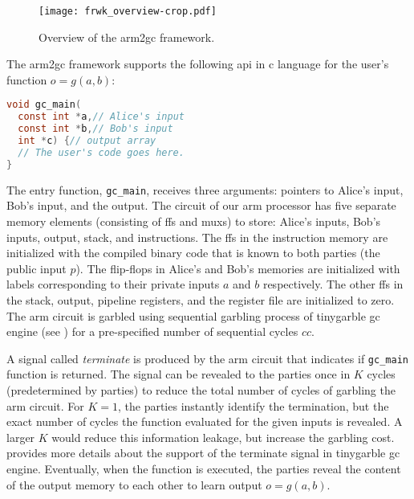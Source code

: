 \begin{figure}
\centering
\texttt{[image: frwk\_overview-crop.pdf]}
\caption{Overview of the \gls{arm2gc} framework.}\label{fig:frwk_overview}
\end{figure}

The \gls{arm2gc} framework supports the following \acrshort{api} in \gls{c} language for the user's function $o = g(a,b)$:
\begin{lstlisting}[language=C,basicstyle=\ttfamily,keywordstyle=\color{blue}\ttfamily,stringstyle=\color{red}\ttfamily,commentstyle=\color{CommentColor}\ttfamily]
void gc_main(
  const int *a,// Alice's input
  const int *b,// Bob's input
  int *c) {// output array
  // The user's code goes here.
}
\end{lstlisting}

The entry function, \texttt{gc\_main}, receives three arguments: pointers to Alice's input, Bob's input, and the output.
The circuit of our \gls{arm} processor has five separate memory elements (consisting of \acrshort{ff}s and \acrshort{mux}s) to store: Alice's inputs, Bob's inputs, output, stack, and instructions.
The \acrshort{ff}s in the instruction memory are initialized with the compiled binary code that is known to both parties (the public input $p$).
The flip-flops in Alice's and Bob's memories are initialized with labels corresponding to their private inputs $a$ and $b$ respectively.
The other \acrshort{ff}s in the stack, output, pipeline registers, and the register file are initialized to zero.
The \gls{arm} circuit is garbled using sequential garbling process of \gls{tinygarble} \acrshort{gc} engine (see ) for a pre-specified number of sequential cycles $cc$.

A signal called \textit{terminate} is produced by the \gls{arm} circuit that indicates if \texttt{gc\_main} function is returned.
The signal can be revealed to the parties once in $K$ cycles (predetermined by parties) to reduce the total number of cycles of garbling the \gls{arm} circuit.
For $K=1$, the parties instantly identify the termination, but the exact number of cycles the function evaluated for the given inputs is revealed.
A larger $K$ would reduce this information leakage, but increase the garbling cost.
 provides more details about the support of the terminate signal in \gls{tinygarble} \acrshort{gc} engine.
Eventually, when the function is executed, the parties reveal the content of the output memory to each other to learn output $o = g(a,b)$.

